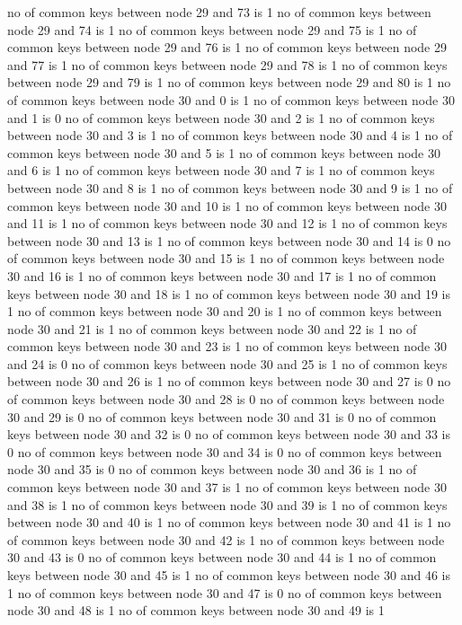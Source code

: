 no of common keys between node 29 and 73 is 1
no of common keys between node 29 and 74 is 1
no of common keys between node 29 and 75 is 1
no of common keys between node 29 and 76 is 1
no of common keys between node 29 and 77 is 1
no of common keys between node 29 and 78 is 1
no of common keys between node 29 and 79 is 1
no of common keys between node 29 and 80 is 1
no of common keys between node 30 and 0 is 1
no of common keys between node 30 and 1 is 0
no of common keys between node 30 and 2 is 1
no of common keys between node 30 and 3 is 1
no of common keys between node 30 and 4 is 1
no of common keys between node 30 and 5 is 1
no of common keys between node 30 and 6 is 1
no of common keys between node 30 and 7 is 1
no of common keys between node 30 and 8 is 1
no of common keys between node 30 and 9 is 1
no of common keys between node 30 and 10 is 1
no of common keys between node 30 and 11 is 1
no of common keys between node 30 and 12 is 1
no of common keys between node 30 and 13 is 1
no of common keys between node 30 and 14 is 0
no of common keys between node 30 and 15 is 1
no of common keys between node 30 and 16 is 1
no of common keys between node 30 and 17 is 1
no of common keys between node 30 and 18 is 1
no of common keys between node 30 and 19 is 1
no of common keys between node 30 and 20 is 1
no of common keys between node 30 and 21 is 1
no of common keys between node 30 and 22 is 1
no of common keys between node 30 and 23 is 1
no of common keys between node 30 and 24 is 0
no of common keys between node 30 and 25 is 1
no of common keys between node 30 and 26 is 1
no of common keys between node 30 and 27 is 0
no of common keys between node 30 and 28 is 0
no of common keys between node 30 and 29 is 0
no of common keys between node 30 and 31 is 0
no of common keys between node 30 and 32 is 0
no of common keys between node 30 and 33 is 0
no of common keys between node 30 and 34 is 0
no of common keys between node 30 and 35 is 0
no of common keys between node 30 and 36 is 1
no of common keys between node 30 and 37 is 1
no of common keys between node 30 and 38 is 1
no of common keys between node 30 and 39 is 1
no of common keys between node 30 and 40 is 1
no of common keys between node 30 and 41 is 1
no of common keys between node 30 and 42 is 1
no of common keys between node 30 and 43 is 0
no of common keys between node 30 and 44 is 1
no of common keys between node 30 and 45 is 1
no of common keys between node 30 and 46 is 1
no of common keys between node 30 and 47 is 0
no of common keys between node 30 and 48 is 1
no of common keys between node 30 and 49 is 1

